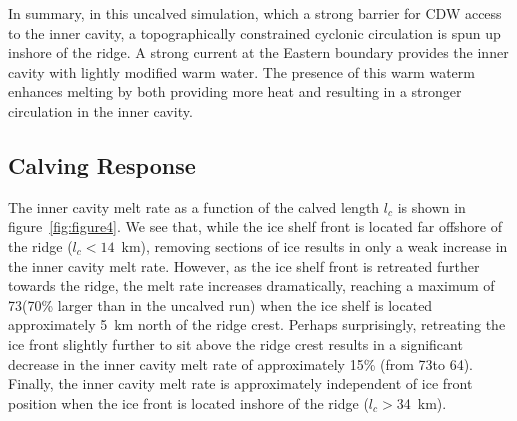 \documentclass[draft]{agujournal2019}
\begin{document}
In summary, in this uncalved simulation, which a strong barrier for CDW access to the inner cavity, a topographically constrained cyclonic circulation is spun up inshore of the ridge. A strong current at the Eastern boundary provides the inner cavity with lightly modified warm water. The presence of this warm waterm enhances melting by both providing more heat and resulting in a stronger circulation in the inner cavity.


\subsection{Calving Response}
The inner cavity melt rate as a function of the calved length $l_c$ is shown in figure~\ref{fig:figure4}. We see that, while the ice shelf front is located far offshore of the ridge ($l_c < 14$~km), removing sections of ice results in only a weak increase in the inner cavity melt rate. However, as the ice shelf front is retreated further towards the ridge, the melt rate increases dramatically, reaching a maximum of 73\mpryr (70\% larger than in the uncalved run) when the ice shelf is located approximately 5~km north of the ridge crest. Perhaps surprisingly, retreating the ice front slightly further to sit above the ridge crest results in a significant decrease in the inner cavity melt rate of approximately 15\% (from 73\mpryr to 64\mpryr). Finally, the inner cavity melt rate is approximately independent of ice front position when the ice front is located inshore of the ridge ($l_c>$34~km).
\end{document}
